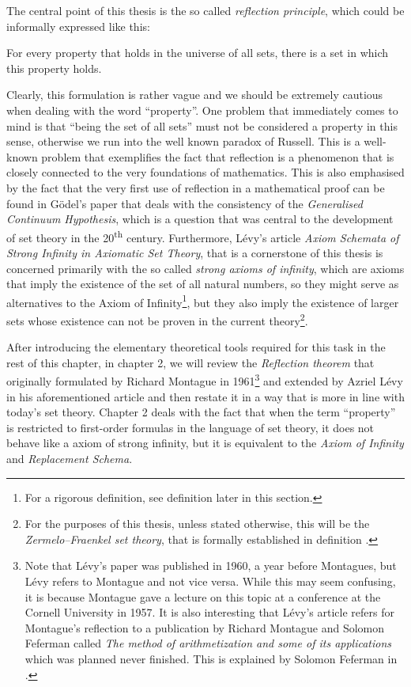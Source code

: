 The central point of this thesis is the so called \emph{reflection principle}, which could be informally expressed like this:
\begin{displayquote}
For every property that holds in the universe of all sets, there is a set in which this property holds.
\end{displayquote}

Clearly, this formulation is rather vague and we should be extremely cautious when dealing with the word ``property''. 
One problem that immediately comes to mind is that ``being the set of all sets'' must not be considered a property in this sense, otherwise we run into the well known paradox of Russell.
This is a well-known problem that exemplifies the fact that reflection is a phenomenon that is closely connected to the very foundations of mathematics.
This is also emphasised by the fact that the very first use of reflection in a mathematical proof can be found in Gödel's paper \cite{Godel1940consistency}  %
that deals with the consistency of the \emph{Generalised Continuum Hypothesis}, which is a question that was central to the development of set theory in the 20\textsuperscript{th} century.
Furthermore, Lévy's article \emph{Axiom Schemata of Strong Infinity in Axiomatic Set Theory}, that is a cornerstone of this thesis is concerned primarily with the so called \emph{strong axioms of infinity}, which are axioms that imply the existence of the set of all natural numbers, so they might serve as alternatives to the Axiom of Infinity\footnote{For a rigorous definition, see definition  later in this section.}, but they also imply the existence of larger sets whose existence can not be proven in the current theory\footnote{For the purposes of this thesis, unless stated otherwise, this will be the \emph{Zermelo–Fraenkel set theory}, that is formally established in definition .}.

After introducing the elementary theoretical tools required for this task in the rest of this chapter, in chapter 2, we will review the \emph{Reflection theorem} that originally formulated by Richard Montague in 1961\footnote{Note that Lévy's paper was published in 1960, a year before Montagues, but Lévy refers to Montague and not vice versa. While this may seem confusing, it is because Montague gave a lecture on this topic at a conference at the Cornell University in 1957. It is also interesting that Lévy's article refers for Montague's reflection to a publication by Richard Montague and Solomon Feferman called \emph{The method of arithmetization and some of its applications} which was planned never finished. This is explained by Solomon Feferman in \cite{Feferman2008}.} and extended by Azriel Lévy in his aforementioned article and then restate it in a way that is more in line with today's set theory. 
Chapter 2 deals with the fact that when the term ``property'' is restricted to first-order formulas in the language of set theory, it does not behave like a axiom of strong infinity, but it is equivalent to the \emph{Axiom of Infinity} and \emph{Replacement Schema}.

